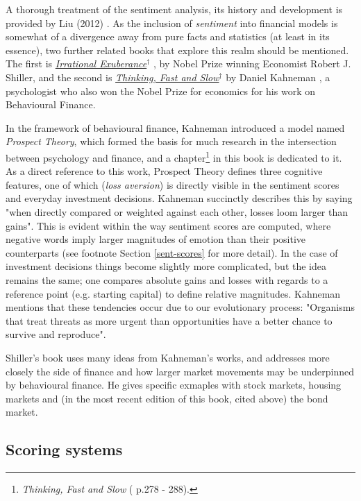 \documentclass{article}
\begin{document}
\vspace{5mm}
A thorough treatment of the sentiment analysis, its history and development is provided by Liu (2012) \cite{Liu:sentiment-analysis}. As the inclusion of \emph{sentiment} into financial models is somewhat of a divergence away from pure facts and statistics (at least in its essence), two further related books that explore this realm should be mentioned. The first is \href{http://irrationalexuberance.com/main.html?src\%3D\%252F}{\emph{Irrational Exuberance$^{\dag{}}$}} \cite{shiller2015irrational}, by Nobel Prize winning Economist Robert J. Shiller, and the second is \href{https://www.youtube.com/watch?v\%3DmWaIE6u3wvw}{\emph{Thinking, Fast and Slow$^{\dag{}}$}} by Daniel Kahneman \cite{kahneman2011thinking}, a psychologist who also won the Nobel Prize for economics for his work on Behavioural Finance.

In the framework of behavioural finance, Kahneman introduced a model named \emph{Prospect Theory}, which formed the basis for much research in the intersection between psychology and finance, and a chapter\footnote{\emph{Thinking, Fast and Slow} (\cite{kahneman2011thinking} p.278 - 288).} in this book is dedicated to it. As a direct reference to this work, Prospect Theory defines three cognitive features, one of which (\emph{loss aversion}) is directly visible in the sentiment scores and everyday investment decisions. Kahneman succinctly describes this by saying "when directly compared or weighted against each other, losses loom larger than gains". This is evident within the way sentiment scores are computed, where negative words imply larger magnitudes of emotion than their positive counterparts (see footnote Section \ref{sent-scores} for more detail). In the case of investment decisions things become slightly more complicated, but the idea remains the same; one compares absolute gains and losses with regards to a reference point (e.g. starting capital) to define relative magnitudes. Kahneman mentions that these tendencies occur due to our evolutionary process: "Organisms that treat threats as more urgent than opportunities have a better chance to survive and reproduce".

Shiller's book uses many ideas from Kahneman's works, and addresses more closely the side of finance and how larger market movements may be underpinned by behavioural finance. He gives specific exmaples with stock markets, housing markets and (in the most recent edition of this book, cited above) the bond market.


\subsection{Scoring systems \label{sent-scores}}
\label{sec-1-2}
\end{document}
